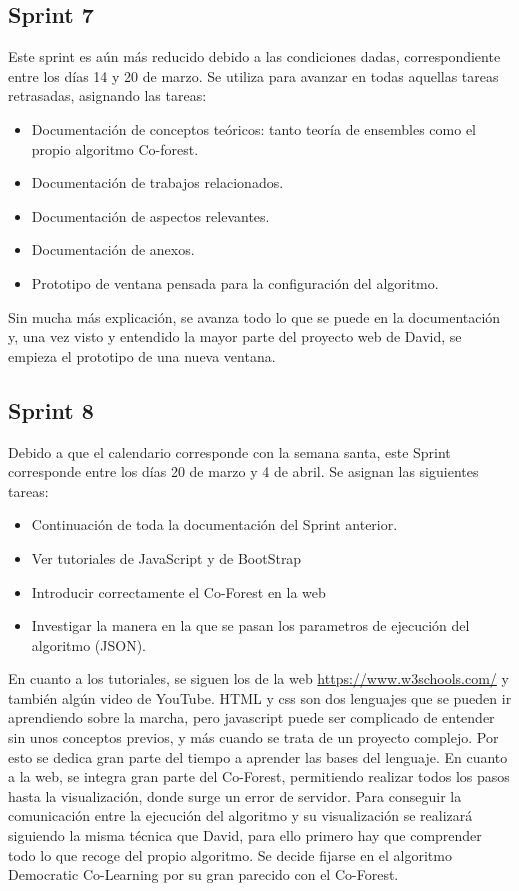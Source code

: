 \subsection{Sprint 7}
Este sprint es aún más reducido debido a las condiciones dadas, correspondiente entre los días 14 y 20 de marzo. Se utiliza para avanzar en todas aquellas tareas retrasadas, asignando las tareas:
\begin{itemize}
	\item Documentación de conceptos teóricos: tanto teoría de ensembles como el propio algoritmo Co-forest.
	\item Documentación de trabajos relacionados.
	\item Documentación de aspectos relevantes.
	\item Documentación de anexos.
	\item Prototipo de ventana pensada para la configuración del algoritmo.
	
\end{itemize}
Sin mucha más explicación, se avanza todo lo que se puede en la documentación y, una vez visto y entendido la mayor parte del proyecto web de David, se empieza el prototipo de una nueva ventana.

\subsection{Sprint 8}
Debido a que el calendario corresponde con la semana santa, este Sprint corresponde entre los días 20 de marzo y 4 de abril. Se asignan las siguientes tareas:
 \begin{itemize}
 	\item Continuación de toda la documentación del Sprint anterior.
 	\item Ver tutoriales de JavaScript y de BootStrap
 	\item Introducir correctamente el Co-Forest en la web
 	\item Investigar la manera en la que se pasan los parametros de ejecución del algoritmo (JSON).
 	
 \end{itemize}
En cuanto a los tutoriales, se siguen los de la web \url{https://www.w3schools.com/} y también algún video de YouTube. HTML y css son dos lenguajes que se pueden ir aprendiendo sobre la marcha, pero javascript puede ser complicado de entender sin unos conceptos previos, y más cuando se trata de un proyecto complejo. Por esto se dedica gran parte del tiempo a aprender las bases del lenguaje. 
En cuanto a la web, se integra gran parte del Co-Forest, permitiendo realizar todos los pasos hasta la visualización, donde surge un error de servidor.
Para conseguir la comunicación entre la ejecución del algoritmo y su visualización se realizará siguiendo la misma técnica que David, para ello primero hay que comprender todo lo que recoge del propio algoritmo. Se decide fijarse en el algoritmo Democratic Co-Learning por su gran parecido con el Co-Forest.

